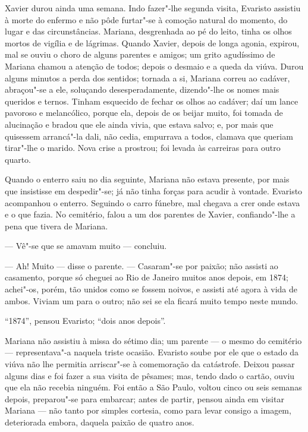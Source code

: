 \begin{linenumbers}
Xavier durou ainda uma semana. Indo fazer"-lhe segunda visita, Evaristo
assistiu à morte do enfermo e não pôde furtar"-se à comoção natural do
momento, do lugar e das circunstâncias. Mariana, desgrenhada ao pé do
leito, tinha os olhos mortos de vigília e de lágrimas. Quando Xavier,
depois de longa agonia, expirou, mal se ouviu o choro de alguns parentes
e amigos; um grito agudíssimo de Mariana chamou a atenção de todos;
depois o desmaio e a queda da viúva. Durou alguns minutos a perda dos
sentidos; tornada a si, Mariana correu ao cadáver, abraçou"-se a ele,
soluçando desesperadamente, dizendo"-lhe os nomes mais queridos e ternos.
Tinham esquecido de fechar os olhos ao cadáver; daí um lance pavoroso e
melancólico, porque ela, depois de os beijar muito, foi tomada de
alucinação e bradou que ele ainda vivia, que estava salvo; e, por mais
que quisessem arrancá"-la dali, não cedia, empurrava a todos, clamava que
queriam tirar"-lhe o marido. Nova crise a prostrou; foi levada às
carreiras para outro quarto.

Quando o enterro saiu no dia seguinte, Mariana não estava presente, por
mais que insistisse em despedir"-se; já não tinha forças para acudir à
vontade. Evaristo acompanhou o enterro. Seguindo o carro fúnebre, mal
chegava a crer onde estava e o que fazia. No cemitério, falou a um dos
parentes de Xavier, confiando"-lhe a pena que tivera de Mariana.

--- Vê"-se que se amavam muito --- concluiu.

--- Ah! Muito --- disse o parente. --- Casaram"-se por paixão; não assisti
ao casamento, porque só cheguei ao Rio de Janeiro muitos anos depois, em
1874; achei"-os, porém, tão unidos como se fossem noivos, e assisti até
agora à vida de ambos. Viviam um para o outro; não sei se ela ficará
muito tempo neste mundo.

``1874'', pensou Evaristo; ``dois anos depois''.

Mariana não assistiu à missa do sétimo dia; um parente --- o mesmo do
cemitério --- representava"-a naquela triste ocasião. Evaristo soube por
ele que o estado da viúva não lhe permitia arriscar"-se à comemoração da
catástrofe. Deixou passar alguns dias e foi fazer a sua visita de
pêsames; mas, tendo dado o cartão, ouviu que ela não recebia ninguém.
Foi então a São Paulo, voltou cinco ou seis semanas depois, preparou"-se
para embarcar; antes de partir, pensou ainda em visitar Mariana --- não
tanto por simples cortesia, como para levar consigo a imagem,
deteriorada embora, daquela paixão de quatro anos.


\end{linenumbers}
